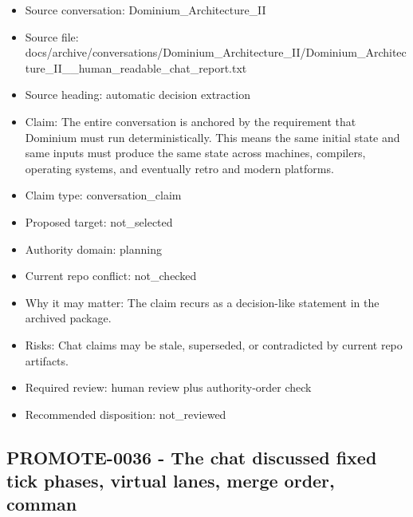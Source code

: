 \documentclass[11pt,a4paper]{report}
\begin{document}
\begin{itemize}
\item Source conversation: Dominium\_Architecture\_II
\item Source file: docs/archive/conversations/Dominium\_Architecture\_II/Dominium\_Architecture\_II\_\_human\_readable\_chat\_report.txt
\item Source heading: automatic decision extraction
\item Claim: The entire conversation is anchored by the requirement that Dominium must run deterministically. This means the same initial state and same inputs must produce the same state across machines, compilers, operating systems, and eventually retro and modern platforms.
\item Claim type: conversation\_claim
\item Proposed target: not\_selected
\item Authority domain: planning
\item Current repo conflict: not\_checked
\item Why it may matter: The claim recurs as a decision-like statement in the archived package.
\item Risks: Chat claims may be stale, superseded, or contradicted by current repo artifacts.
\item Required review: human review plus authority-order check
\item Recommended disposition: not\_reviewed
\end{itemize}

\subsection{PROMOTE-0036 - The chat discussed fixed tick phases, virtual lanes, merge order, comman}
\end{document}
